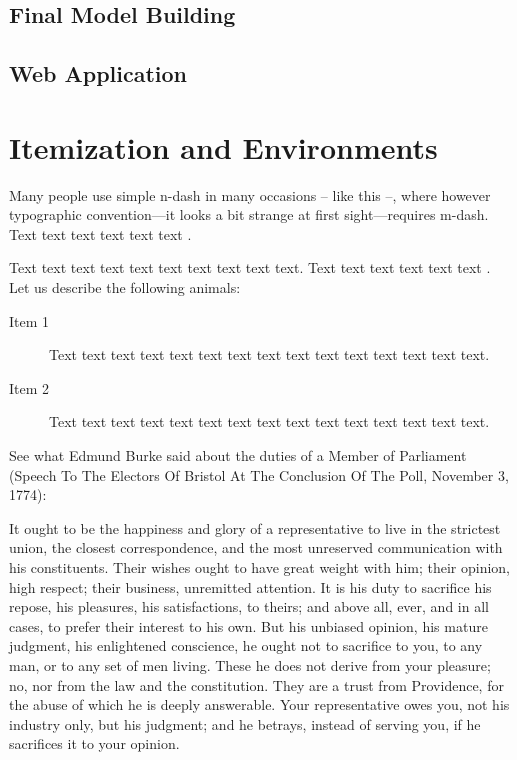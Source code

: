 \subsection{Final Model Building}
\subsection{Web Application}

\section{Itemization and Environments}

Many people use simple n-dash in many occasions -- like this --, where however typographic convention---it looks a bit strange at first sight---requires m-dash.
Text text text text text text \citet{Haufler2006}. 

Text text text text text text text text text text. Text text text text text text \citet{Wells2001}. Let us describe the following animals:

\begin{description}
\item[Item 1] Text text text text text text text text text text text text text text text.
\item[Item 2] Text text text text text text text text text text text text text text text.
\end{description}

See what Edmund Burke said about the duties of a Member of Parliament (Speech To The Electors Of Bristol At The Conclusion Of The Poll, November 3, 1774):

\begin{quotesmall}
It ought to be the happiness and glory of a representative to live in the strictest union, the closest correspondence, and the most unreserved communication with his constituents. 
Their wishes ought to have great weight with him; their opinion, high respect; their business, unremitted attention.
It is his duty to sacrifice his repose, his pleasures, his satisfactions, to theirs; and above all, ever, and in all cases, to prefer their interest to his own.
But his unbiased opinion, his mature judgment, his enlightened conscience, he ought not to sacrifice to you, to any man, or to any set of men living.
These he does not derive from your pleasure; no, nor from the law and the constitution.
They are a trust from Providence, for the abuse of which he is deeply answerable.
Your representative owes you, not his industry only, but his judgment; and he betrays, instead of serving you, if he sacrifices it to your opinion.
\end{quotesmall}

